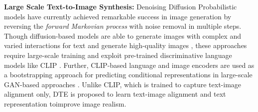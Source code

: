 \noindent \textbf{Large Scale Text-to-Image Synthesis:} Denoising Diffusion Probabilistic models \citep{denosing_diffusion} have currently achieved remarkable success in image generation \citep{ddpm,imporved_ddpm,diffusion_beats_GAN} by reversing the \textit{forward Markovian process} with noise removal in multiple steps. Though diffusion-based models are able to generate images with complex and varied interactions for text and generate high-quality images \citep{Dalle_2,imagen,Vq_diffusion}, these approaches require large-scale training and exploit pre-trained discriminative language models like CLIP \citep{clip}. Further, CLIP-based language and image encoders are used as a bootstrapping approach for predicting conditional representations in large-scale GAN-based approaches \citep{galip, scaling_up_gan, lafite}. Unlike CLIP, which is trained to capture text-image alignment only, DTE is proposed to learn text-image alignment and text representation toimprove image realism. 

